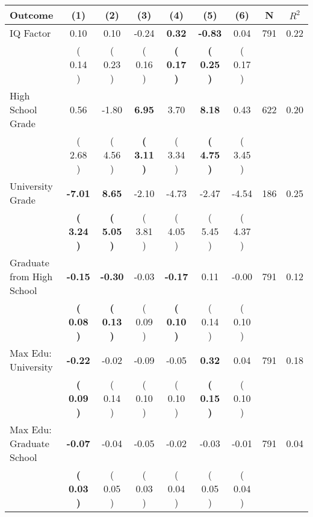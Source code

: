 \begin{tabular}{lcccccccc}
\toprule
 \textbf{Outcome} & \textbf{(1)} & \textbf{(2)} & \textbf{(3)} & \textbf{(4)} & \textbf{(5)} & \textbf{(6)} & \textbf{N} & \textbf{$ R^2$} \\
\midrule
IQ Factor &      0.10 &      0.10 &     -0.24 & \textbf{     0.32} & \textbf{    -0.83} &      0.04 & 791 &       0.22 \\ 
 & (     0.14 ) & (     0.23 ) & (     0.16 ) & \textbf{(     0.17 )} & \textbf{(     0.25 )} & (     0.17 ) & \\
High School Grade &      0.56 &     -1.80 & \textbf{     6.95} &      3.70 & \textbf{     8.18} &      0.43 & 622 &       0.20 \\ 
 & (     2.68 ) & (     4.56 ) & \textbf{(     3.11 )} & (     3.34 ) & \textbf{(     4.75 )} & (     3.45 ) & \\
University Grade & \textbf{    -7.01} & \textbf{     8.65} &     -2.10 &     -4.73 &     -2.47 &     -4.54 & 186 &       0.25 \\ 
 & \textbf{(     3.24 )} & \textbf{(     5.05 )} & (     3.81 ) & (     4.05 ) & (     5.45 ) & (     4.37 ) & \\
Graduate from High School & \textbf{    -0.15} & \textbf{    -0.30} &     -0.03 & \textbf{    -0.17} &      0.11 &     -0.00 & 791 &       0.12 \\ 
 & \textbf{(     0.08 )} & \textbf{(     0.13 )} & (     0.09 ) & \textbf{(     0.10 )} & (     0.14 ) & (     0.10 ) & \\
Max Edu: University & \textbf{    -0.22} &     -0.02 &     -0.09 &     -0.05 & \textbf{     0.32} &      0.04 & 791 &       0.18 \\ 
 & \textbf{(     0.09 )} & (     0.14 ) & (     0.10 ) & (     0.10 ) & \textbf{(     0.15 )} & (     0.10 ) & \\
Max Edu: Graduate School & \textbf{    -0.07} &     -0.04 &     -0.05 &     -0.02 &     -0.03 &     -0.01 & 791 &       0.04 \\ 
 & \textbf{(     0.03 )} & (     0.05 ) & (     0.03 ) & (     0.04 ) & (     0.05 ) & (     0.04 ) & \\
\bottomrule
\end{tabular}

